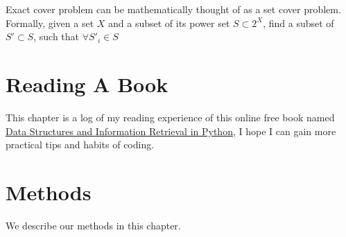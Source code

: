 \documentclass[]{book}
\begin{document}
Exact cover problem can be mathematically thought of as a set cover problem.
Formally, given a set \(X\) and a subset of its power set \(S \subset 2^X\), find
a subset of \(S' \subset S\), such that \(\forall S'_i \in S\)

\hypertarget{reading-a-book}{%
\chapter{Reading A Book}\label{reading-a-book}}

This chapter is a log of my reading experience of this online free book named \href{https://allendowney.github.io/DSIRP/index.html}{Data Structures and Information Retrieval in Python}, I hope I can gain more practical tips and habits of coding.

\hypertarget{methods}{%
\chapter{Methods}\label{methods}}

We describe our methods in this chapter.


\end{document}
